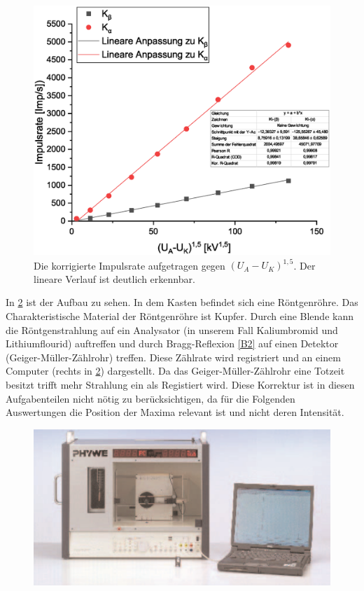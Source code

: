 \documentclass[
	a4paper,
	12pt,
	pagesize,
	ngerman
]{scrartcl}
\begin{document}
\begin{figure}[h!]
	\centering
	\includegraphics[scale = 0.6]{spannung2.eps}
	\caption{Die korrigierte Impulsrate aufgetragen gegen $(U_A-U_K)^{1,5}$. Der lineare Verlauf ist deutlich erkennbar.}
	\label{spannung2}
\end{figure}
In \cref{B1} ist der Aufbau zu sehen. In dem Kasten befindet sich eine Röntgenröhre. Das Charakteristische Material der Röntgenröhre ist Kupfer. Durch eine Blende kann die Röntgenstrahlung auf ein Analysator (in unserem Fall Kaliumbromid und Lithiumflourid) auftreffen und durch Bragg-Reflexion \cref{B2} auf einen Detektor (Geiger-Müller-Zählrohr) treffen. Diese Zählrate wird registriert und an einem Computer (rechts in \cref{B1}) dargestellt. Da das Geiger-Müller-Zählrohr eine Totzeit besitzt trifft mehr Strahlung ein als Registiert wird. Diese Korrektur ist in diesen Aufgabenteilen nicht nötig zu berücksichtigen, da für die Folgenden Auswertungen die Position der Maxima relevant ist und nicht deren Intensität.
\begin{figure}[h!]
    \centering
    \includegraphics[scale = 1]{aufbau.png}
    \caption{}
    \label{B1}
\end{figure}
\end{document}
